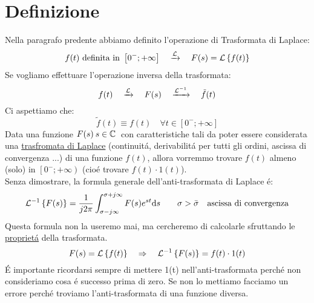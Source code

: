 \documentclass[../main.tex]{subfiles}
\begin{document}
	\section{Definizione}
	Nella paragrafo predente abbiamo definito l'operazione di Trasformata di Laplace:
	$$\Lapl{f(t)\ \text{definita in}\ \left[ 0^-;+\infty \right]}{F(s)=\Lbrace{f(t)}}  $$
	Se vogliamo effettuare l'operazione inversa della trasformata:
	$$ f(t) \quad \xrightarrow{\mathcal{L}} \quad F(s)  \quad \xrightarrow{\mathcal{L}^{-1}} \quad  \tilde{f}(t) $$
	Ci aspettiamo che: 
	$$ \tilde{f}(t) \equiv f(t) \quad \forall t \in \left[ 0^-;+\infty \right] $$
	\linebreak
	Data una funzione $ F(s)\: s \in \mathbb{C}\: $ con caratteristiche tali da poter essere considerata una \hyperref[sec:traformata_laplace]{trasfromata di Laplace} (continuit\'{a}, derivabilit\'{a} per tutti gli ordini, ascissa di convergenza ...) di una funzione $ f(t) $, allora vorremmo trovare $ f(t) $ almeno (solo) in $ \left[ 0^-;+\infty \right) $ (cio\'{e} trovare $ f(t) \cdot 1(t) $).\\
	\linebreak
	Senza dimostrare, la formula generale dell'anti-trasformata di Laplace \'{e}:
	\[ \mathcal{L}^{-1} \left\lbrace F(s) \right\rbrace = \frac{1}{j2\pi} \int_{ \sigma - j \infty }^{ \sigma + j \infty } F(s) e^{st} \mathrm{d}s \qquad \sigma > \bar{\sigma} \quad \text{ascissa di convergenza} \]
	Questa formula non la useremo mai, ma cercheremo di calcolarle sfruttando le \hyperref[subsec:prop_laplace]{propriet\'{a}} della trasformata.
	\[ F(s) = \mathcal{L} \left\lbrace f(t) \right\rbrace \quad \Rightarrow \quad \mathcal{L}^{-1} \left\lbrace F(s) \right\rbrace = f(t) \cdot 1(t) \]
	\'{E} importante ricordarsi sempre di mettere 1(t) nell'anti-trasformata perch\'{e} non consideriamo cosa \'{e} successo prima di zero. Se non lo mettiamo facciamo un errore perch\'{e} troviamo l'anti-trasformata di una funzione diversa. 
\end{document}
